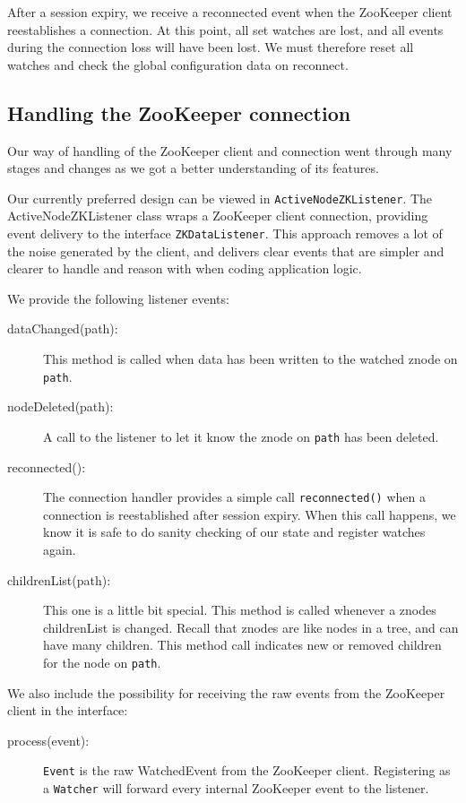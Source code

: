 After a session expiry, we receive a reconnected event when the ZooKeeper client reestablishes a connection. At this point, all set watches are lost, and all events during the connection loss will have been lost. We must therefore reset all watches and check the global configuration data on reconnect. 

\subsection{Handling the ZooKeeper connection}
Our way of handling of the ZooKeeper client and connection went through many stages and changes as we got a better understanding of its features.

Our currently preferred design can be viewed in \texttt{ActiveNodeZKListener}.
The ActiveNodeZKListener class wraps a ZooKeeper client connection, providing event delivery to the interface \texttt{ZKDataListener}. 
This approach removes a lot of the noise generated by the client, and delivers clear events that are simpler and clearer to handle and reason with when coding application logic.

We provide the following listener events:
\begin{description}

	\item[dataChanged(path):] 
		This method is called when data has been written to the watched znode on \texttt{path}.
	\item[nodeDeleted(path):] 
		A call to the listener to let it know the znode on \texttt{path} has been deleted.
	\item[reconnected():] 
		The connection handler provides a simple call \texttt{reconnected()} when a connection is reestablished after session expiry. When this call happens, we know it is safe to do sanity checking of our state and register watches again.
	\item[childrenList(path):]
		This one is a little bit special. This method is called whenever a znodes childrenList is changed. Recall that znodes are like nodes in a tree, and can have many children. This method call indicates new or removed children for the node on \texttt{path}.

\end{description}

We also include the possibility for receiving the raw events from the ZooKeeper client in the interface:

\begin{description}
	\item[process(event):]
		\texttt{Event} is the raw WatchedEvent from the ZooKeeper client. Registering as a \texttt{Watcher} will forward every internal ZooKeeper event to the listener.

\end{description}



